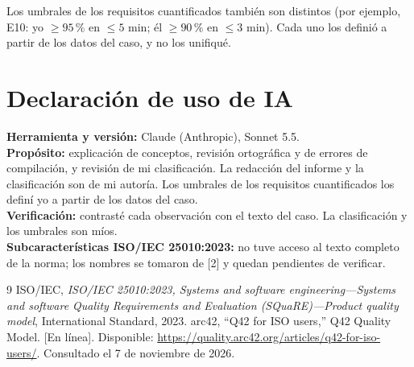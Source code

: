 \documentclass[11pt,a4paper]{article}
\begin{document}
Los umbrales de los requisitos cuantificados también son distintos (por
ejemplo, E10: yo $\geq 95\,\%$ en $\leq 5$ min; él $\geq 90\,\%$ en $\leq 3$
min). Cada uno los definió a partir de los datos del caso, y no los unifiqué.
\section{Declaración de uso de IA}
\textbf{Herramienta y versión:} Claude (Anthropic), Sonnet 5.5.\\
\textbf{Propósito:} explicación de conceptos, revisión ortográfica y de errores de compilación, y revisión de mi clasificación. La redacción del informe y la clasificación son de mi autoría. Los umbrales de los requisitos cuantificados los definí yo a partir de los datos del caso.\\
\textbf{Verificación:} contrasté cada observación con el texto del caso. La clasificación y los umbrales son míos.\\
\textbf{Subcaracterísticas ISO/IEC 25010:2023:} no tuve acceso al texto completo de la norma; los nombres se tomaron de [2] y quedan pendientes de verificar.

\begin{thebibliography}{9}
 ISO/IEC, \emph{ISO/IEC 25010:2023, Systems and software engineering---Systems and software Quality Requirements and Evaluation (SQuaRE)---Product quality model}, International Standard, 2023.
 arc42, ``Q42 for ISO users,'' Q42 Quality Model. [En l\'inea]. Disponible: \url{https://quality.arc42.org/articles/q42-for-iso-users/}. Consultado el 7 de noviembre de 2026.
\end{thebibliography}
\end{document}
